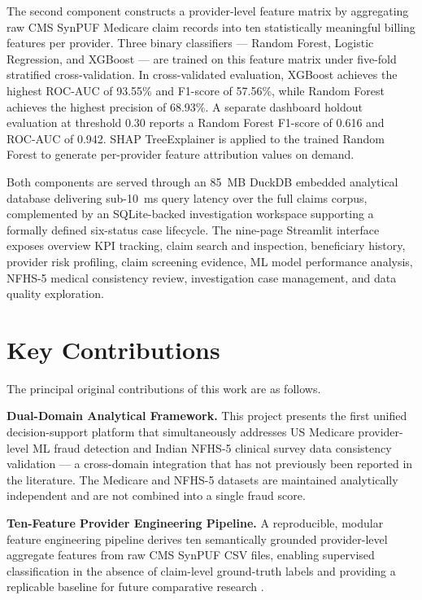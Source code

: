 The second component constructs a provider-level feature matrix by aggregating raw CMS SynPUF Medicare claim records into ten statistically meaningful billing features per provider. Three binary classifiers --- Random Forest, Logistic Regression, and XGBoost --- are trained on this feature matrix under five-fold stratified cross-validation. In cross-validated evaluation, XGBoost achieves the highest ROC-AUC of 93.55\% and F1-score of 57.56\%, while Random Forest achieves the highest precision of 68.93\%. A separate dashboard holdout evaluation at threshold 0.30 reports a Random Forest F1-score of 0.616 and ROC-AUC of 0.942. SHAP TreeExplainer is applied to the trained Random Forest to generate per-provider feature attribution values on demand.

Both components are served through an 85~MB DuckDB embedded analytical database delivering sub-10~ms query latency over the full claims corpus, complemented by an SQLite-backed investigation workspace supporting a formally defined six-status case lifecycle. The nine-page Streamlit interface exposes overview KPI tracking, claim search and inspection, beneficiary history, provider risk profiling, claim screening evidence, ML model performance analysis, NFHS-5 medical consistency review, investigation case management, and data quality exploration.

\section{Key Contributions}
\label{sec:contributions}

The principal original contributions of this work are as follows.

\textbf{Dual-Domain Analytical Framework.} This project presents the first unified decision-support platform that simultaneously addresses US Medicare provider-level ML fraud detection and Indian NFHS-5 clinical survey data consistency validation --- a cross-domain integration that has not previously been reported in the literature. The Medicare and NFHS-5 datasets are maintained analytically independent and are not combined into a single fraud score.

\textbf{Ten-Feature Provider Engineering Pipeline.} A reproducible, modular feature engineering pipeline derives ten semantically grounded provider-level aggregate features from raw CMS SynPUF CSV files, enabling supervised classification in the absence of claim-level ground-truth labels and providing a replicable baseline for future comparative research \cite{b17}.

